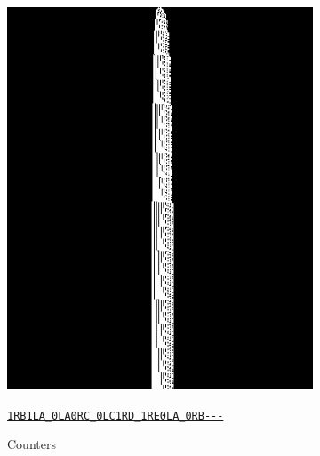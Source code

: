 \documentclass[a4paper,british]{article}
\theoremstyle{definition} %
\numberwithin{equation}{section}
\theoremstyle{definition} %
\newcommand{\tm}[1]{\href{https://bbchallenge.org/#1}{\texttt{\nolinkurl{#1}}}}
\begin{document}
\begin{figure}[htbp]
\begin{subfigure}{0.3\textwidth}
        \includegraphics[width=\linewidth]{figures/zoology/counters_1RB1LA_0LA0RC_0LC1RD_1RE0LA_0RB---.png}
        \caption*{Counters}
        {\scriptsize \tm{1RB1LA_0LA0RC_0LC1RD_1RE0LA_0RB---}}
    \end{subfigure}
    \hfill
    \begin{subfigure}{0.3\textwidth}
        \centering

\end{subfigure}
\end{figure}
\end{document}
